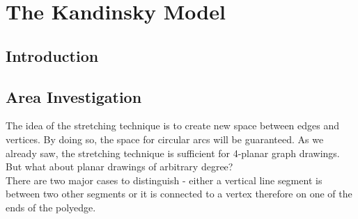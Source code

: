 \section{The Kandinsky Model}
\subsection{Introduction}
\subsection{Area Investigation}
The idea of the stretching technique is to create new space between edges and vertices. By doing so, the space for circular arcs will be guaranteed. As we already saw, the stretching technique is sufficient for 4-planar graph drawings. But what about planar drawings of arbitrary degree?\\
There are two major cases to distinguish - either a vertical line segment is between two other segments or it is connected to a vertex therefore on one of the ends of the polyedge.
